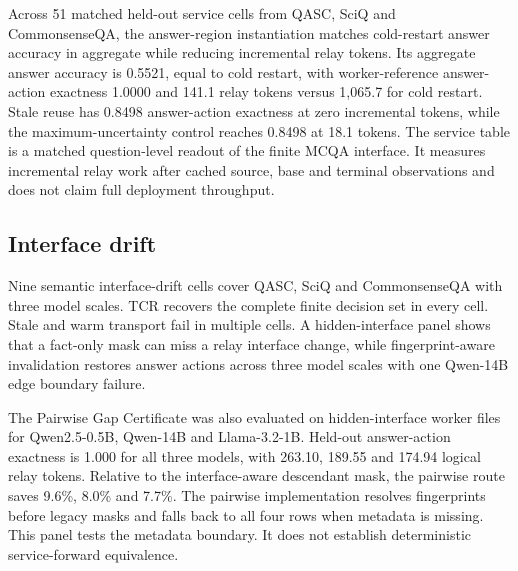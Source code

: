 \documentclass[11pt]{article}
\begin{document}
Across 51 matched held-out service cells from QASC, SciQ and CommonsenseQA,
the answer-region instantiation matches cold-restart answer accuracy in aggregate while reducing incremental relay tokens. Its aggregate answer accuracy is 0.5521, equal to cold restart, with worker-reference answer-action exactness 1.0000 and 141.1 relay tokens versus 1,065.7 for cold restart. Stale reuse has 0.8498
answer-action exactness at zero incremental tokens, while the maximum-uncertainty
control reaches 0.8498 at 18.1 tokens. The service table is a matched
question-level readout of the finite MCQA interface. It measures incremental
relay work after cached source, base and terminal observations and does not
claim full deployment throughput.

\begin{table}[t]
\centering\small
{}
\caption{Matched held-out service utility over 51 cells. Answer-region $q=.9$
preserves the cold-restart answer accuracy and removes 86.8\% of incremental
relay tokens.}
\end{table}

\subsection{Interface drift}
Nine semantic interface-drift cells cover QASC, SciQ and CommonsenseQA with three model scales. TCR recovers the complete finite decision set in every cell. Stale and warm transport fail in multiple cells. A hidden-interface panel shows that a fact-only mask can miss a relay interface change, while fingerprint-aware invalidation restores answer actions across three model scales with one Qwen-14B edge boundary failure.

The Pairwise Gap Certificate was also evaluated on hidden-interface worker files for Qwen2.5-0.5B, Qwen-14B and Llama-3.2-1B. Held-out answer-action exactness is 1.000 for all three models, with 263.10, 189.55 and 174.94 logical relay tokens. Relative to the interface-aware descendant mask, the pairwise route saves 9.6\%, 8.0\% and 7.7\%. The pairwise implementation resolves fingerprints before legacy masks and falls back to all four rows when metadata is missing. This panel tests the metadata boundary. It does not establish deterministic service-forward equivalence.
\end{document}
